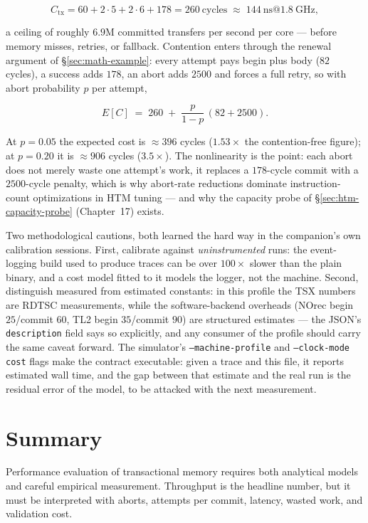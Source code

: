 $$
C_{\mathrm{tx}} = 60 + 2{\cdot}5 + 2{\cdot}6 + 178 = 260\ \mathrm{cycles}
\;\approx\; 144\ \mathrm{ns} @ 1.8\ \mathrm{GHz},
$$

a ceiling of roughly $6.9$M committed transfers per second per core --- before
memory misses, retries, or fallback. Contention enters through the renewal
argument of \S\ref{sec:math-example}: every attempt pays begin plus body
($82$ cycles), a success adds $178$, an abort adds $2500$ and forces a full
retry, so with abort probability $p$ per attempt,

$$
E[C] \;=\; 260 \;+\; \frac{p}{1-p}\,(82 + 2500).
$$

At $p=0.05$ the expected cost is ${\approx}396$ cycles ($1.53\times$ the
contention-free figure); at $p=0.20$ it is ${\approx}906$ cycles
($3.5\times$). The nonlinearity is the point: each abort does not merely waste
one attempt's work, it replaces a $178$-cycle commit with a $2500$-cycle
penalty, which is why abort-rate reductions dominate instruction-count
optimizations in HTM tuning --- and why the capacity probe of
\S\ref{sec:htm-capacity-probe} (Chapter~17) exists.

Two methodological cautions, both learned the hard way in the companion's own
calibration sessions. First, calibrate against \emph{uninstrumented} runs:
the event-logging build used to produce traces can be over $100\times$ slower
than the plain binary, and a cost model fitted to it models the logger, not
the machine. Second, distinguish measured from estimated constants: in this
profile the TSX numbers are RDTSC measurements, while the software-backend
overheads (NOrec begin $25$/commit $60$, TL2 begin $35$/commit $90$) are
structured estimates --- the JSON's \texttt{description} field says so
explicitly, and any consumer of the profile should carry the same caveat
forward. The simulator's \texttt{--machine-profile} and
\texttt{--clock-mode cost} flags make the contract executable: given a trace
and this file, it reports estimated wall time, and the gap between that
estimate and the real run is the residual error of the model, to be attacked
with the next measurement.


\section{Summary}

Performance evaluation of transactional memory requires both analytical models and careful empirical measurement. Throughput is the headline number, but it must be interpreted with aborts, attempts per commit, latency, wasted work, and validation cost.

